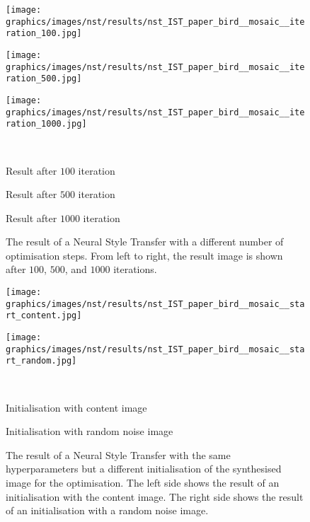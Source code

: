 \begin{figure}
	\centering
	\begin{minipage}{.33\textwidth}
		\centering
		\texttt{[image: graphics/images/nst/results/nst\_IST\_paper\_bird\_\_mosaic\_\_iteration\_100.jpg]}
	\end{minipage}%
	\begin{minipage}{.33\textwidth}
		\centering
		\texttt{[image: graphics/images/nst/results/nst\_IST\_paper\_bird\_\_mosaic\_\_iteration\_500.jpg]}
	\end{minipage}%
	\begin{minipage}{.33\textwidth}
	\centering
	\texttt{[image: graphics/images/nst/results/nst\_IST\_paper\_bird\_\_mosaic\_\_iteration\_1000.jpg]}
	\end{minipage}\\ \vspace{0.15cm}
	\begin{minipage}{.33\textwidth}
		\centering
		Result after $100$ iteration
	\end{minipage}%
	\begin{minipage}{.33\textwidth}
		\centering
		Result after $500$ iteration
	\end{minipage}%
	\begin{minipage}{.33\textwidth}
		\centering
		Result after $1000$ iteration
	\end{minipage}
	\caption{The result of a Neural Style Transfer with a different number of optimisation steps. From left to right, the result image is shown after $100$, $500$, and $1000$ iterations.}
	\label{fig:iteration_nst}
\end{figure}

\begin{figure}
	\centering
	\begin{minipage}{.5\textwidth}
		\centering
		\texttt{[image: graphics/images/nst/results/nst\_IST\_paper\_bird\_\_mosaic\_\_start\_content.jpg]}
	\end{minipage}%
	\begin{minipage}{.5\textwidth}
		\centering
		\texttt{[image: graphics/images/nst/results/nst\_IST\_paper\_bird\_\_mosaic\_\_start\_random.jpg]}
	\end{minipage}\\ \vspace{0.15cm}
	\begin{minipage}{.5\textwidth}
		\centering
		Initialisation with content image
	\end{minipage}%
	\begin{minipage}{.5\textwidth}
		\centering
		Initialisation with random noise image
	\end{minipage}
	\caption{The result of a Neural Style Transfer with the same hyperparameters but a different initialisation of the synthesised image for the optimisation. The left side shows the result of an initialisation with the content image. The right side shows the result of an initialisation with a random noise image.}
	\label{fig:diff_init_nst}
\end{figure}

